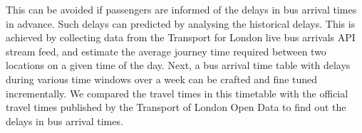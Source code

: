 \par This can be avoided if passengers are informed of the delays in bus arrival times in advance. Such delays can predicted by analysing the historical delays. This is achieved by collecting data from the Transport for London live bus arrivals API stream feed\cite{live_bus_arrivals}, and estimate the average journey time required between two locations on a given time of the day. Next, a bus arrival time table with delays during various time windows over a week can be crafted and fine tuned incrementally. We compared the travel times in this timetable with the official travel times published by the Transport of London Open Data to find out the delays in bus arrival times.